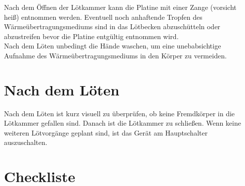 \documentclass{\basedir/fablab-document}
\begin{document}
Nach dem Öffnen der Lötkammer kann die Platine mit einer Zange (vorsicht heiß) entnommen werden. Eventuell noch anhaftende Tropfen des Wärmeübertragungsmediums sind in das Lötbecken abzuschütteln oder abzustreifen bevor die Platine entgültig entnommen wird.\\

Nach dem Löten unbedingt die Hände waschen, um eine unebabsichtige Aufnahme des Wärmeübertragungsmediums in den Körper zu vermeiden.

\section{Nach dem Löten}

Nach dem Löten ist kurz visuell zu überprüfen, ob keine Fremdkörper in die Lötkammer gefallen sind. Danach ist die Lötkammer zu schließen. Wenn keine weiteren Lötvorgänge geplant sind, ist das Gerät am Hauptschalter auszuschalten.

	\section{Checkliste}
\end{document}
